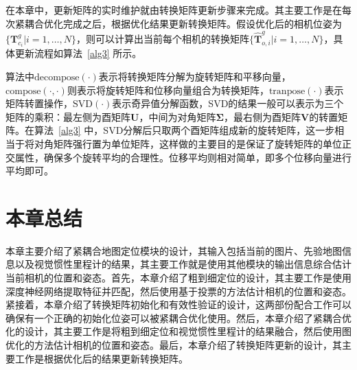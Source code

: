 在本章中，更新矩阵的实时维护就由转换矩阵更新步骤来完成。其主要工作是在每次紧耦合优化完成之后，根据优化结果更新转换矩阵。假设优化后的相机位姿为$\{ \symbf{T}_{c_i}^g | i=1,\dots, N\}$，则可以计算出当前每个相机的转换矩阵$\{ \hat{\symbf{T}}_{o,i}^g | i=1,\dots, N\}$，具体更新流程如算法~\ref{alg3} 所示。

算法中$\text{decompose}(\cdot)$表示将转换矩阵分解为旋转矩阵和平移向量，$\text{compose}(\cdot, \cdot)$则表示将旋转矩阵和位移向量组合为转换矩阵，$\text{tranpose}(\cdot)$表示矩阵转置操作，$\text{SVD}(\cdot)$表示奇异值分解函数，SVD的结果一般可以表示为三个矩阵的乘积：最左侧为酉矩阵$\symbf{U}$，中间为对角矩阵$\symbf{\Sigma}$，最右侧为酉矩阵$\symbf{V}$的转置矩阵。在算法~\ref{alg3} 中，SVD分解后只取两个酉矩阵组成新的旋转矩阵，这一步相当于将对角矩阵强行置为单位矩阵，这样做的主要目的是保证了旋转矩阵的单位正交属性，确保多个旋转平均的合理性。位移平均则相对简单，即多个位移向量进行平均即可。

\section{本章总结}
本章主要介绍了紧耦合地图定位模块的设计，其输入包括当前的图片、先验地图信息以及视觉惯性里程计的结果，其主要工作就是使用其他模块的输出信息综合估计当前相机的位置和姿态。首先，本章介绍了粗到细定位的设计，其主要工作是使用深度神经网络提取特征并匹配，然后使用基于投票的方法估计相机的位置和姿态。紧接着，本章介绍了转换矩阵初始化和有效性验证的设计，这两部份配合工作可以确保有一个正确的初始化位姿可以被紧耦合优化使用。然后，本章介绍了紧耦合优化的设计，其主要工作是将粗到细定位和视觉惯性里程计的结果融合，然后使用图优化的方法估计相机的位置和姿态。最后，本章介绍了转换矩阵更新的设计，其主要工作是根据优化后的结果更新转换矩阵。